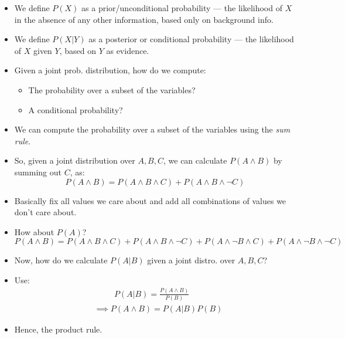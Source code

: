 \documentclass{article}
\begin{document}
\begin{itemize}
    \item We define $P(X)$ as a prior/unconditional probability --- the likelihood of $X$ in the absence of any other information, based only on background info.
    \item We define $P(X|Y)$ as a posterior or conditional probability --- the likelihood of $X$ given $Y$, based on $Y$ as evidence.
    \item Given a joint prob. distribution, how do we compute:
        \begin{itemize}
            \item The probability over a subset of the variables?
            \item A conditional probability?
        \end{itemize}
    \item We can compute the probability over a subset of the variables using the \emph{sum rule}.
    \item So, given a joint distribution over $A, B, C$, we can calculate $P(A \wedge B)$ by summing out $C$, as:
        \[
            P(A \wedge B) = P(A \wedge B \wedge C) + P(A \wedge B \wedge \neg C)
        \]
    \item Basically fix all values we care about and add all combinations of values we don't care about.
    \item How about $P(A)$?
        \[
            P(A \wedge B) = P(A \wedge B \wedge C) + P(A \wedge B \wedge \neg C) + P(A \wedge \neg B \wedge C) + P(A \wedge \neg B \wedge \neg C)
        \]
    \item Now, how do we calculate $P(A|B)$ given a joint distro. over $A, B, C$?
    \item Use:
        \begin{align*}
            &\qquad ~~ P(A|B) = \frac{P(A \wedge B)}{P(B)}\\
            &\implies P(A \wedge B)= P(A|B)P(B)
        \end{align*}
    \item Hence, the product rule.
\end{itemize}
\end{document}
